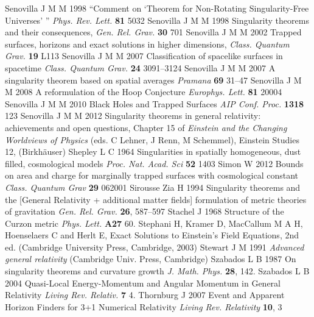 \documentclass[12pt]{iopart}
\begin{document}
\begin{thebibliography}{999}
 Senovilla J M M 1998 ``Comment on 
`Theorem for Non-Rotating Singularity-Free Universes' '' {\it Phys. Rev. Lett.} {\bf 81} 5032
 Senovilla J M M 1998 Singularity theorems and their 
consequences, {\it Gen. Rel. Grav.} {\bf 30} 701
 Senovilla J M M 2002 Trapped surfaces, horizons and exact 
solutions in higher dimensions, {\it Class. Quantum Grav.} {\bf 19} L113
 Senovilla J M M 2007 Classification of spacelike surfaces in spacetime {\it Class. Quantum Grav.} {\bf 24} 3091--3124
 Senovilla J M M 2007 A singularity theorem based on spatial averages {\it Pramana} {\bf 69} 31--47
 Senovilla J M M 2008 A reformulation of the Hoop Conjecture {\it Europhys. Lett.} {\bf 81} 20004
 Senovilla J M M 2010 Black Holes and Trapped Surfaces {\it AIP Conf. Proc.} {\bf 1318} 123
 Senovilla J M M 2012 Singularity theorems in general relativity: achievements and open questions, Chapter 15 of {\it Einstein and the Changing Worldviews of Physics} (eds. C Lehner, J Renn, M Schemmel), Einstein Studies 12, 
(Birkh\"auser)
 Shepley L C 1964 Singularities in spatially homogeneous, dust filled, cosmological models {\it Proc. Nat. Acad. Sci} {\bf 52} 1403
 Simon W 2012 Bounds on area and charge for marginally trapped surfaces with cosmological constant {\it Class. Quantum Grav} {\bf 29} 062001
 Sirousse Zia H 1994 Singularity theorems and the [General Relativity + additional matter fields] formulation of metric theories of gravitation {\it Gen. Rel. Grav.} {\bf 26}, 587--597%
 Stachel J 1968 Structure of the Curzon metric {\it Phys. Lett.} {\bf A27} 60.%
 Stephani H, Kramer D, MacCallum M A H, 
Hoenselaers C and  Herlt E,
Exact Solutions to Einstein's Field Equations, 2nd ed. (Cambridge
University Press, Cambridge, 2003)
 Stewart J M 1991 {\it Advanced general relativity}
(Cambridge Univ. Press, Cambridge)
 Szabados L B 1987 On singularity theorems and curvature growth {\it J. Math. Phys.} {\bf 28},
142.%
 Szabados L B 2004 Quasi-Local Energy-Momentum and Angular Momentum in General Relativity {\it Living Rev. Relativ.} {\bf 7} 4.%
 Thornburg J 2007 Event and Apparent Horizon Finders for 3+1 Numerical Relativity {\it Living Rev. Relativity} {\bf 10}, 3 %

\end{thebibliography}
\end{document}
